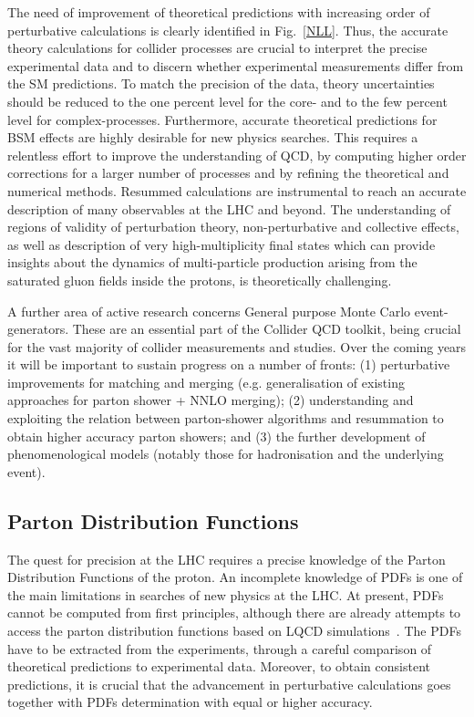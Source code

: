  The  need of improvement of theoretical predictions with increasing order of perturbative calculations    is clearly identified  in  Fig.~\ref{NLL}.
Thus, the  accurate theory calculations for collider processes are crucial to interpret the precise experimental data and to discern whether experimental measurements differ from  the SM predictions.  To match the precision of the data, theory uncertainties should be reduced to  the one  percent level for the core-  and to the few percent level for complex-processes. Furthermore, accurate theoretical predictions for BSM effects are highly desirable for  new physics searches. 
This requires a
relentless effort to improve the  understanding of QCD, by computing higher order
corrections for a larger number of processes and by refining the  theoretical and numerical  methods.
Resummed calculations are instrumental to reach an accurate description of many observables at the LHC and beyond. The understanding of regions of validity of perturbation theory, non-perturbative  and collective effects, as well as     description of very high-multiplicity final states which 
  can  provide    insights  about  the  dynamics  of  multi-particle production arising from the saturated gluon fields inside the protons,
is theoretically challenging.


A further area of active research concerns General purpose Monte Carlo event-generators. These are an essential part of the Collider QCD toolkit, being crucial for the vast majority of collider measurements and studies. Over the coming years it will be important to sustain progress on a number of fronts: (1) perturbative improvements for matching and merging (e.g. generalisation of existing approaches for parton shower + NNLO merging); (2) understanding and exploiting the relation between parton-shower algorithms and resummation to obtain higher accuracy parton showers; and (3) the further development of phenomenological models (notably those for hadronisation and the underlying event).





 \subsection{ Parton Distribution Functions}

The quest for precision at the LHC  requires
a precise knowledge of the  Parton Distribution Functions  of the proton. An incomplete  knowledge of PDFs  is one of the main limitations in searches of new physics at the LHC.   At present,
PDFs cannot be  computed from first principles, although there are already
attempts to access the parton distribution functions based on LQCD simulations~\cite{Lin:2017snn}. The PDFs
have to be extracted from  the experiments, through  a careful comparison of theoretical predictions to experimental data.
Moreover, to obtain consistent predictions, it is crucial that the advancement in perturbative calculations goes together  with PDFs determination  with equal or higher  accuracy.

